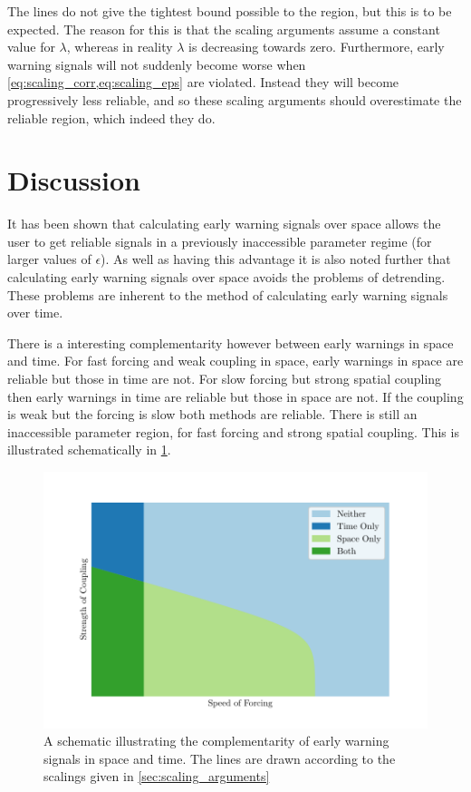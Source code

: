 The lines do not give the tightest bound possible to the region, but this is to be expected. The reason for this is that the scaling arguments assume
a constant value for $\lambda$, whereas in reality $\lambda$ is decreasing towards zero. Furthermore, early warning signals will not suddenly become worse
when \cref{eq:scaling_corr,eq:scaling_eps} are violated. Instead they will become progressively less reliable, and so these scaling arguments should overestimate
the reliable region, which indeed they do.

\section{Discussion}
It has been shown that calculating early warning signals over space allows the user to get reliable
signals in a previously inaccessible parameter regime (for larger values of $\epsilon$).  As well
as having this advantage it is also noted further that calculating early warning signals over space avoids 
the problems of detrending. These problems are inherent to the method of calculating early warning signals over
time.

There is a interesting complementarity however between early warnings in space and time. For fast forcing
and weak coupling in space, early warnings in space are reliable but those in time are not. For slow forcing
but strong spatial coupling then early warnings in time are reliable but those in space are not. If the
coupling is weak but the forcing is slow both methods are reliable. There is still an inaccessible parameter
region, for fast forcing and strong spatial coupling. This is illustrated schematically in \cref{fig:idealised_plot}.
\begin{figure}
  \centering
  \includegraphics[width=\textwidth,keepaspectratio]{idealised_plot}
  \caption[A schematic showing the complementarity of spatial and temporal early warning signals]{A schematic illustrating the complementarity of early warning signals in space and time.
    The lines are drawn according to the scalings given in \cref{sec:scaling_arguments}}
  \label{fig:idealised_plot}
\end{figure}

